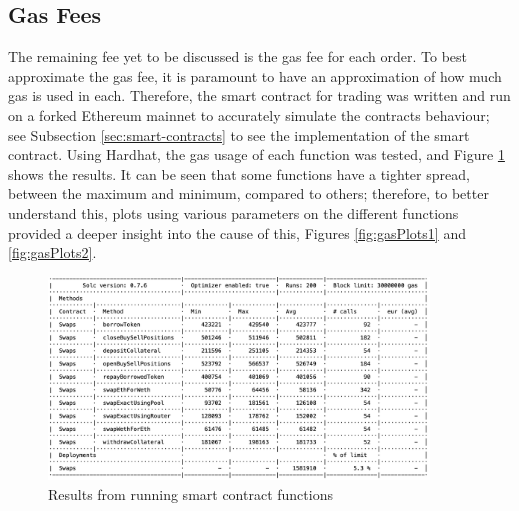 \subsection{Gas Fees}
The remaining fee yet to be discussed is the gas fee for each order. To best approximate the gas fee, it is paramount to have an approximation of how much gas is used in each. Therefore, the smart contract for trading was written and run on a forked Ethereum mainnet to accurately simulate the contracts behaviour; see Subsection \ref{sec:smart-contracts} to see the implementation of the smart contract. Using Hardhat, the gas usage of each function was tested, and Figure \ref{fig:gasResult} shows the results. It can be seen that some functions have a tighter spread, between the maximum and minimum, compared to others; therefore, to better understand this, plots using various parameters on the different functions provided a deeper insight into the cause of this, Figures \ref{fig:gasPlots1} and \ref{fig:gasPlots2}.
\begin{figure}[!htb]
    \centering
    \includegraphics[width=0.9\textwidth]{project/Images/gas_fee_results.png}
    \caption{Results from running smart contract functions \label{fig:gasResult}}
\end{figure}

